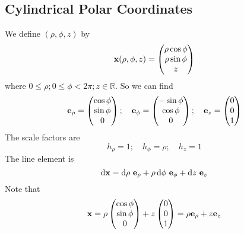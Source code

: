 \subsection{Cylindrical Polar Coordinates}
We define \((\rho, \phi, z)\) by
\[
	\vb x(\rho, \phi, z) = \begin{pmatrix}
		\rho \cos \phi \\
		\rho \sin \phi \\
		z
	\end{pmatrix}
\]
where \(0 \leq \rho; 0 \leq \phi < 2 \pi; z \in \mathbb R\).
So we can find
\[
	\vb e_\rho = \begin{pmatrix}
		\cos \phi \\ \sin \phi \\ 0
	\end{pmatrix};\quad \vb e_\phi = \begin{pmatrix}
		-\sin \phi \\ \cos \phi \\ 0
	\end{pmatrix};\quad \vb e_z = \begin{pmatrix}
		0 \\ 0 \\ 1
	\end{pmatrix}
\]
The scale factors are
\[
	h_\rho = 1;\quad h_\phi = \rho;\quad h_z = 1
\]
The line element is
\[
	\dd \vb x = \dd{\rho} \, \vb e_\rho + \rho \dd{\phi} \, \vb e_\phi + \dd{z} \, \vb e_z
\]
Note that
\[
	\vb x = \rho \begin{pmatrix}
		\cos \phi \\ \sin \phi \\ 0
	\end{pmatrix} + z \begin{pmatrix}
		0 \\ 0 \\ 1
	\end{pmatrix} = \rho \vb e_\rho + z \vb e_z
\]

